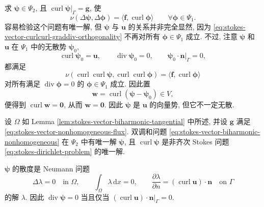 求 $\boldsymbol{\psi}\in\Psi_2$, 且
$\operatorname{curl}\boldsymbol{\psi}|_\Gamma=\mathbf{g}$, 使
\begin{equation}\label{eq:stokes-vector-biharmonic-nonhomogeneous}
\nu(\Delta\boldsymbol{\psi},
\Delta\boldsymbol{\phi})
=
\langle\mathbf{f},
\operatorname{curl}\boldsymbol{\phi}\rangle
\qquad
\forall\boldsymbol{\phi}\in\Psi_1.
\end{equation}
容易检验这个问题有唯一解, 但
$\boldsymbol{\psi}$ 与 $\mathbf{u}$ 的关系并非完全显然,
因为 \eqref{eq:stokes-vector-curlcurl-graddiv-orthogonality}
不再对所有 $\boldsymbol{\phi}\in\Psi_1$ 成立.
不过, 注意 $\boldsymbol{\psi}$ 和 $\mathbf{u}$ 在 $\Psi_1$ 中的无散势
$\boldsymbol{\psi}_0$,
\[
\operatorname{curl}\boldsymbol{\psi}_0=\mathbf{u},
\qquad
\operatorname{div}\boldsymbol{\psi}_0=0,
\qquad
\boldsymbol{\psi}_0\cdot\mathbf{n}|_\Gamma=0,
\]
都满足
\[
\nu(
\operatorname{curl}\operatorname{curl}\boldsymbol{\psi},
\operatorname{curl}\operatorname{curl}\boldsymbol{\phi})
=
\langle\mathbf{f},
\operatorname{curl}\boldsymbol{\phi}\rangle
\]
对所有满足
$\operatorname{div}\boldsymbol{\phi}=0$ 的
$\boldsymbol{\phi}\in\Psi_1$ 成立. 因此置
\[
\mathbf{w}
=
\operatorname{curl}
(\boldsymbol{\psi}-\boldsymbol{\psi}_0)
\in V,
\]
便得到
$\operatorname{curl}\mathbf{w}=\mathbf{0}$, 从而
$\mathbf{w}=\mathbf{0}$. 因此
$\boldsymbol{\psi}$ 是 $\mathbf{u}$ 的向量势,
但它不一定无散.

\setcounter{statement}{5}
\begin{Theorem}\label{thm:stokes-vector-biharmonic-nonhomogeneous}
设 $\Omega$ 如 Lemma
\ref{lem:stokes-vector-biharmonic-tangential} 中所述, 并设
$\mathbf{g}$ 满足 \eqref{eq:stokes-vector-nonhomogeneous-flux}.
双调和问题
\eqref{eq:stokes-vector-biharmonic-nonhomogeneous}
在 $\Psi_2$ 中有唯一解 $\boldsymbol{\psi}$, 且
$\operatorname{curl}\boldsymbol{\psi}$ 是非齐次 Stokes 问题
\eqref{eq:stokes-dirichlet-problem} 的唯一解.
\end{Theorem}

\setcounter{statement}{10}
\begin{Remark}\label{rem:stokes-vector-potential-divergence-neumann}
$\boldsymbol{\psi}$ 的散度是 Neumann 问题
\[
\Delta\lambda=0\quad\text{in }\Omega,
\qquad
\int_\Omega\lambda\,\mathrm{d}x=0,
\qquad
\frac{\partial\lambda}{\partial n}
=(\operatorname{curl}\mathbf{u})\cdot\mathbf{n}
\quad\text{on }\Gamma
\]
的解 $\lambda$. 因此
$\operatorname{div}\boldsymbol{\psi}=0$ 当且仅当
$(\operatorname{curl}\mathbf{u})\cdot\mathbf{n}|_\Gamma=0$.
\end{Remark}

